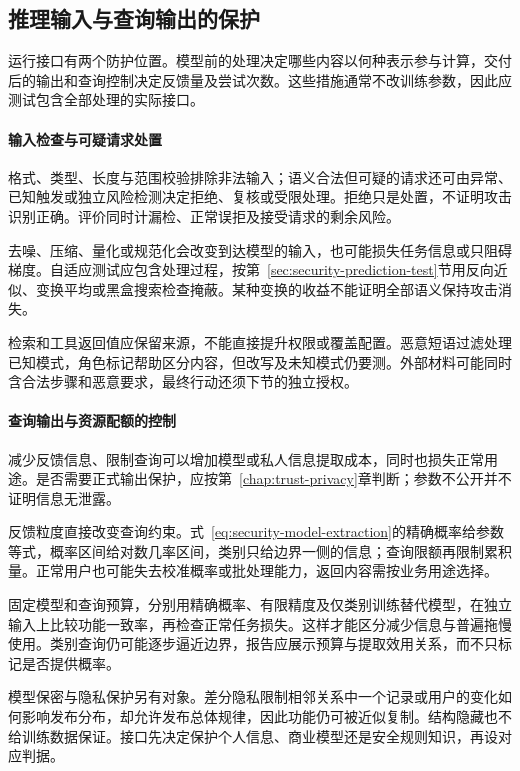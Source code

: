 \subsection{推理输入与查询输出的保护}
\label{sec:security-information-defense}
\label{sec:security-input-defense}

运行接口有两个防护位置。模型前的处理决定哪些内容以何种表示参与计算，交付后的输出和查询控制决定反馈量及尝试次数。这些措施通常不改训练参数，因此应测试包含全部处理的实际接口。

\paragraph{输入检查与可疑请求处置}

格式、类型、长度与范围校验排除非法输入；语义合法但可疑的请求还可由异常、已知触发或独立风险检测决定拒绝、复核或受限处理。拒绝只是处置，不证明攻击识别正确。评价同时计漏检、正常误拒及接受请求的剩余风险。

去噪、压缩、量化或规范化会改变到达模型的输入，也可能损失任务信息或只阻碍梯度。自适应测试应包含处理过程，按第~\ref{sec:security-prediction-test}节用反向近似、变换平均或黑盒搜索检查掩蔽。某种变换的收益不能证明全部语义保持攻击消失。

检索和工具返回值应保留来源，不能直接提升权限或覆盖配置。恶意短语过滤处理已知模式，角色标记帮助区分内容，但改写及未知模式仍要测。外部材料可能同时含合法步骤和恶意要求，最终行动还须下节的独立授权。

\paragraph{查询输出与资源配额的控制}

减少反馈信息、限制查询可以增加模型或私人信息提取成本，同时也损失正常用途。是否需要正式输出保护，应按第~\ref{chap:trust-privacy}章判断；参数不公开并不证明信息无泄露。

反馈粒度直接改变查询约束。式~\eqref{eq:security-model-extraction}的精确概率给参数等式，概率区间给对数几率区间，类别只给边界一侧的信息；查询限额再限制累积量。正常用户也可能失去校准概率或批处理能力，返回内容需按业务用途选择。

固定模型和查询预算，分别用精确概率、有限精度及仅类别训练替代模型，在独立输入上比较功能一致率，再检查正常任务损失。这样才能区分减少信息与普遍拖慢使用。类别查询仍可能逐步逼近边界，报告应展示预算与提取效用关系，而不只标记是否提供概率。

模型保密与隐私保护另有对象。差分隐私限制相邻关系中一个记录或用户的变化如何影响发布分布，却允许发布总体规律，因此功能仍可被近似复制。结构隐藏也不给训练数据保证。接口先决定保护个人信息、商业模型还是安全规则知识，再设对应判据。

